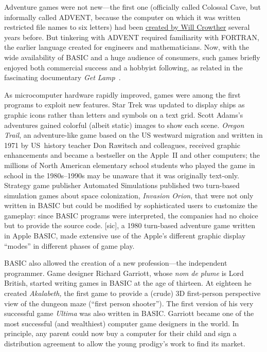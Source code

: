 \begin{tangent} Adventure games were not new---the first one
(officially called Colossal Cave, but informally called ADVENT,
because the computer on which it was written restricted file names to
six letters) had been
\href{https://armandofox.blogspot.com/2007/08/the-original-original-adventure.html}{created
by Will Crowther} several years before.
But tinkering with ADVENT required familiarity with FORTRAN, the
earlier language created for engineers and mathematicians.
Now, with the wide availability of BASIC and a huge audience of
consumers, such games briefly enjoyed both commercial success and a
hobbyist following, as related in the fascinating documentary
\emph{Get Lamp}~\cite{get_lamp}.
\end{tangent} As microcomputer hardware rapidly improved, games were
among the first programs to exploit new features.
Star Trek was updated to display ships as graphic icons rather than
letters and symbols on a text grid.
Scott Adams's adventures gained colorful (albeit static) images to
show each scene.
\emph{Oregon Trail}, an adventure-like game based on the US westward
migration and written in 1971 by US~history teacher Don Rawitsch and
colleagues, received graphic enhancements and became a bestseller on
the Apple~II and other computers; the millions of North American
elementary school students who played the game in school in the
1980s--1990s may be unaware that it was originally text-only.
Strategy game publisher Automated Simulations published two turn-based
simulation games about space colonization,
\emph{Invasion Orion}, that were not only written in BASIC but could
be modified by sophisticated users to customize the gameplay: since
BASIC programs were interpreted, the companies had no choice but to
provide the source code.
 [sic], a 1980 turn-based adventure
game written in Apple BASIC, made extensive use of the Apple's
different graphic display ``modes'' in different phases of game play.


BASIC also allowed the creation of a new profession---the independent
programmer.
Game designer Richard Garriott, whose \emph{nom de plume} is Lord
British, started writing games in BASIC at the age of thirteen.
At eighteen he created \emph{Akalabeth,} the first game to provide a
(crude) 3D first-person perspective view of the dungeon maze (``first
person shooter'').
The first version of his very successful game \emph{Ultima} was also
written in BASIC.
Garriott became one of the most successful (and wealthiest) computer
game designers in the world.
In principle, any parent could now buy a computer for their child and
sign a distribution agreement to allow the young prodigy's work to
find its market.


